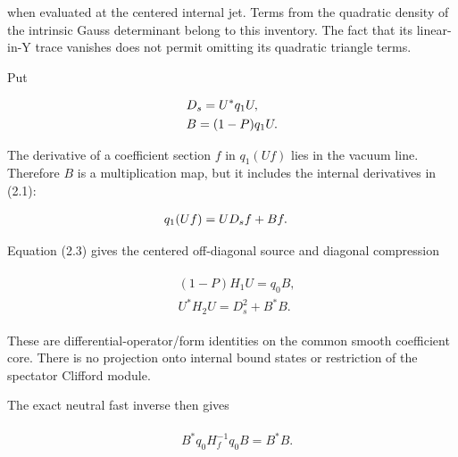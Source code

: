 when evaluated at the centered internal jet. Terms from the quadratic
density of the intrinsic Gauss determinant belong to this inventory. The
fact that its linear-in-Y trace vanishes does not permit omitting its
quadratic triangle terms.

Put

\begin{gather*}
\begin{aligned}
& D_{s} = U^{*} q_{1} U, \\
& B = (1-P) q_{1} U.
\end{aligned}\notag
\end{gather*}

The derivative of a coefficient section \(f\) in \(q_{1}(Uf)\) lies in
the vacuum line. Therefore \(B\) is a multiplication map, but it
includes the internal derivatives in (2.1):

\begin{gather*}
\begin{aligned}
& q_{1}(Uf) = U D_{s} f + Bf.
\end{aligned}\notag
\end{gather*}

Equation (2.3) gives the centered off-diagonal source and diagonal
compression

\begin{gather*}
\begin{aligned}
& (1-P) H_{1} U = q_{0} B, \\
& U^{*} H_{2} U = D_{s}^{2} + B^{*}B.
\end{aligned}\tag{3.3}
\end{gather*}

These are differential-operator/form identities on the common smooth
coefficient core. There is no projection onto internal bound states or
restriction of the spectator Clifford module.

The exact neutral fast inverse then gives

\begin{gather*}
\begin{aligned}
& B^{*} q_{0} H_{f}^{-1} q_{0} B = B^{*}B.
\end{aligned}\tag{3.4}
\end{gather*}

